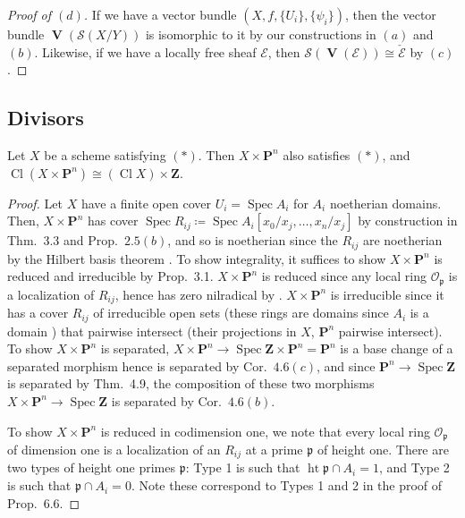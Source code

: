 \documentclass[10pt]{article}
\theoremstyle{definition}
\theoremstyle{remark}
\numberwithin{equation}{section}
\numberwithin{figure}{subsubsection}
\DeclareMathOperator{\Spec}{Spec}
\DeclareMathOperator{\Ht}{ht}
\DeclareMathOperator{\V}{\mathbf{V}}
\DeclareMathOperator{\Cl}{Cl}
\newcommand{\EE}{\mathscr{E}}
\newcommand{\OO}{\mathcal{O}}
\newcommand{\Ss}{\mathscr{S}}
\begin{document}
\begin{proof}[Proof of $(d)$]
  If we have a vector bundle $(X,f,\{U_i\},\{\psi_i\})$, then the vector bundle $\V(\Ss(X/Y))$ is isomorphic to it by our constructions in $(a)$ and $(b)$. Likewise, if we have a locally free sheaf $\EE$, then $\Ss(\V(\EE)) \cong \check{\EE}$ by $(c)$.
\end{proof}

\subsection{Divisors}
\begin{problem}
  Let $X$ be a scheme satisfying $(*)$. Then $X \times \mathbf{P}^n$ also satisfies $(*)$, and $\Cl(X \times \mathbf{P}^n) \cong (\Cl X) \times \mathbf{Z}$.
\end{problem}
\begin{proof}
  Let $X$ have a finite open cover $U_i = \Spec A_i$ for $A_i$ noetherian domains. Then, $X \times \mathbf{P}^n$ has cover $\Spec R_{ij} \coloneqq \Spec A_i[x_0/x_j,\ldots,x_n/x_j]$ by construction in Thm.~3.3 and Prop.~$2.5(b)$, and so is noetherian since the $R_{ij}$ are noetherian by the Hilbert basis theorem \cite[Thm.~7.5]{AM69}. To show integrality, it suffices to show $X \times \mathbf{P}^n$ is reduced and irreducible by Prop.~3.1. $X \times \mathbf{P}^n$ is reduced since any local ring $\OO_\mathfrak{p}$ is a localization of $R_{ij}$, hence has zero nilradical by \cite[Cor.~3.12]{AM69}. $X \times \mathbf{P}^n$ is irreducible since it has a cover $R_{ij}$ of irreducible open sets (these rings are domains since $A_i$ is a domain \cite[Prop.~7.2.4]{DF04}) that pairwise intersect (their projections in $X$, $\mathbf{P}^n$ pairwise intersect). To show $X \times \mathbf{P}^n$ is separated, $X \times \mathbf{P}^n \to \Spec \mathbf{Z} \times \mathbf{P}^n = \mathbf{P}^n$ is a base change of a separated morphism hence is separated by Cor.~$4.6(c)$, and since $\mathbf{P}^n \to \Spec \mathbf{Z}$ is separated by Thm.~4.9, the composition of these two morphisms $X \times \mathbf{P}^n \to \Spec \mathbf{Z}$ is separated by Cor.~$4.6(b)$.
  \par To show $X \times \mathbf{P}^n$ is reduced in codimension one, we note that every local ring $\OO_\mathfrak{p}$ of dimension one is a localization of an $R_{ij}$ at a prime $\mathfrak{p}$ of height one. There are two types of height one primes $\mathfrak{p}$: Type 1 is such that $\Ht \mathfrak{p} \cap A_i = 1$, and Type 2 is such that $\mathfrak{p} \cap A_i = 0$. Note these correspond to Types 1 and 2 in the proof of Prop.~6.6.

\end{proof}
\end{document}
